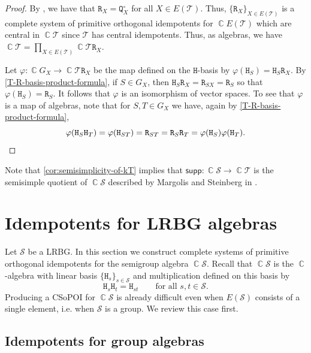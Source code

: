 \documentclass[11pt, oneside, reqno]{amsart}
\theoremstyle{definition}
\numberwithin{equation}{section}
\DeclareMathOperator{\C}{\mathbb{C}}
\def \SS{{\mathcal{S}}}
\def \TT{{\mathcal{T}}}
\def \kk{\C}
\def \supp{\mathsf{supp}}
\newcommand{\B}[1]{\mathtt{#1}} 			%
\begin{document}
\begin{proof}
    By , we have that
    $\B{R}_{X} = \B{Q}^\circ_{X}$ for all $X \in E(\TT)$.
    Thus, $\{ \B{R}_{X} \}_{X \in E(\TT)}$ is a complete system of primitive
    orthogonal idempotents for $\kk E(\TT)$ which are central in $\kk \TT$
    since $\TT$ has central idempotents. Thus, as algebras, we have
    $\kk \TT = \prod_{X \in E(\TT)} \kk \TT \B{R}_{X}$.

    Let $\varphi: \kk G_{X} \xrightarrow{} \kk \TT \B{R}_{X}$
    be the map defined on the $\B{H}$-basis by $\varphi(\B{H}_{S}) = \B{H}_{S} \B{R}_{X}$.
    By \cref{T-R-basis-product-formula},
    if $S \in G_{X}$, then $\B{H}_{S} \B{R}_{X} = \B{R}_{SX} = \B{R}_{S}$
    so that $\varphi(\B{H}_{S}) = \B{R}_{S}$.
    It follows that $\varphi$ is an isomorphism of vector spaces.
    To see that $\varphi$ is a map of algebras, note that
    for $S, T \in G_{X}$ we have, again by \cref{T-R-basis-product-formula},
    \begin{equation*}
        \varphi(\B{H}_{S} \B{H}_{T})
        = \varphi(\B{H}_{ST})
        = \B{R}_{ST}
        = \B{R}_{S} \B{R}_{T}
        = \varphi(\B{H}_{S}) \varphi(\B{H}_{T}).
        \qedhere
    \end{equation*}
\end{proof}

Note that \cref{cor:semisimplicity-of-kT} implies  that $\supp : \kk\SS \to \kk\TT$ is the semisimple quotient of $\kk
\SS$ described by Margolis and Steinberg in \cite[\S~5.2.1]{ms11HomologySemigroups}.

\section{Idempotents for LRBG algebras}\label{sec:idemforLRBGs}

Let $\SS$ be a LRBG.
In this section we construct complete systems of primitive orthogonal idempotents for the semigroup algebra $\kk \SS$.
Recall that $\kk \SS$ is the $\kk$-algebra with linear basis $\{ \B{H}_s \}_{s \in \SS}$ and multiplication defined on this basis by
\[
    \B{H}_s\B{H}_t = \B{H}_{st}
    \qquad
    \text{for all } s,t \in \SS.
\]
Producing a CSoPOI for $\kk \SS$ is already difficult even when $E(\SS)$ consists of a single element, i.e. when $\SS$ is a group.
We review this case first.

\subsection{Idempotents for group algebras}\label{ss:isotypic}
\end{document}
